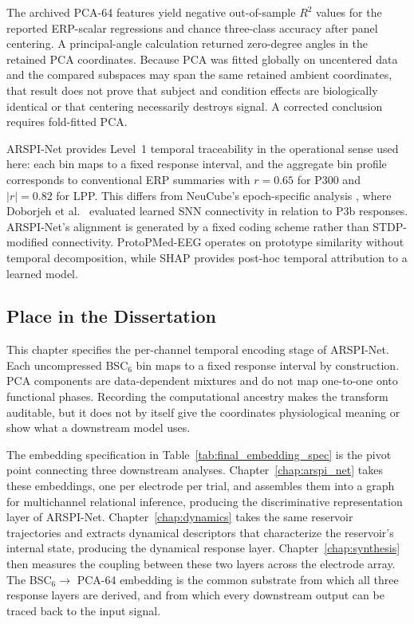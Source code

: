 The archived PCA-64 features yield negative out-of-sample $R^2$ values for the reported ERP-scalar regressions and chance three-class accuracy after panel centering. A principal-angle calculation returned zero-degree angles in the retained PCA coordinates. Because PCA was fitted globally on uncentered data and the compared subspaces may span the same retained ambient coordinates, that result does not prove that subject and condition effects are biologically identical or that centering necessarily destroys signal. A corrected conclusion requires fold-fitted PCA.

ARSPI-Net provides Level~1 temporal traceability in the operational sense used here: each bin maps to a fixed response interval, and the aggregate bin profile corresponds to conventional ERP summaries with $r = 0.65$ for P300 and $|r| = 0.82$ for LPP. This differs from NeuCube's epoch-specific analysis \cite{kasabov_neucube_2014}, where Doborjeh et al.\ \cite{doborjeh_explainable_2021} evaluated learned SNN connectivity in relation to P3b responses. ARSPI-Net's alignment is generated by a fixed coding scheme rather than STDP-modified connectivity. ProtoPMed-EEG \cite{barnett_protopmed_2024} operates on prototype similarity without temporal decomposition, while SHAP provides post-hoc temporal attribution to a learned model.

\subsection{Place in the Dissertation}

This chapter specifies the per-channel temporal encoding stage of ARSPI-Net. Each uncompressed BSC$_6$ bin maps to a fixed response interval by construction. PCA components are data-dependent mixtures and do not map one-to-one onto functional phases. Recording the computational ancestry makes the transform auditable, but it does not by itself give the coordinates physiological meaning or show what a downstream model uses.

The embedding specification in Table~\ref{tab:final_embedding_spec} is the pivot point connecting three downstream analyses. Chapter~\ref{chap:arspi_net} takes these embeddings, one per electrode per trial, and assembles them into a graph for multichannel relational inference, producing the discriminative representation layer of ARSPI-Net. Chapter~\ref{chap:dynamics} takes the same reservoir trajectories and extracts dynamical descriptors that characterize the reservoir's internal state, producing the dynamical response layer. Chapter~\ref{chap:synthesis} then measures the coupling between these two layers across the electrode array. The BSC$_6 \to$ PCA-64 embedding is the common substrate from which all three response layers are derived, and from which every downstream output can be traced back to the input signal.
